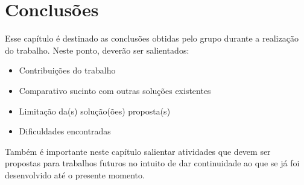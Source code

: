 \chapter[Conclusões]{Conclusões}

Esse capítulo é destinado as conclusões obtidas pelo grupo durante a realização do trabalho. Neste ponto, deverão ser salientados:
\begin{itemize}
\item Contribuições do trabalho
\item Comparativo sucinto com outras soluções existentes
\item Limitação da(s) solução(ões) proposta(s)
\item Dificuldades encontradas
\end{itemize}

Também é importante neste capítulo salientar atividades que devem ser propostas para trabalhos futuros no intuito de dar continuidade ao que se já foi desenvolvido até o presente momento.